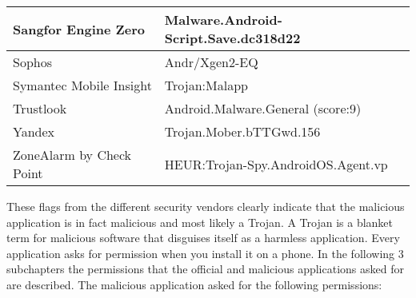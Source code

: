 \begin{tabular}{|l|l|}
    Sangfor Engine Zero      & Malware.Android-Script.Save.dc318d22 \\ \hline
    Sophos                   & Andr/Xgen2-EQ                        \\ \hline
    Symantec Mobile Insight  & Trojan:Malapp                        \\ \hline
    Trustlook                & Android.Malware.General (score:9)    \\ \hline
    Yandex                   & Trojan.Mober.bTTGwd.156              \\ \hline
    ZoneAlarm by Check Point & HEUR:Trojan-Spy.AndroidOS.Agent.vp   \\ \hline
\end{tabular}

These flags from the different security vendors clearly indicate that the malicious application is in fact malicious and most likely a Trojan. A Trojan is a blanket term for malicious software that disguises itself as a harmless application.
\newpage
{}
Every application asks for permission when you install it on a phone. In the following 3 subchapters the permissions that the official and malicious applications asked for are described.
The malicious application asked for the following permissions:

